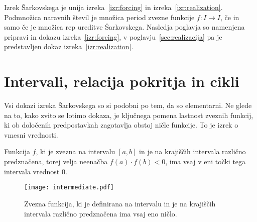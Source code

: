 \documentclass[../TG_magistrsko_delo_sections.tex]{subfiles}
\begin{document}
Izrek Šarkovskega je unija izreka~\ref{izr:forcing} in izreka~\ref{izr:realization}. Podmnožica naravnih števil je množica period zvezne funkcije $f:I \to I$, če in samo če je množica rep ureditve Šarkovskega. Nasledja poglavja so namenjena pripravi in dokazu izreka~\ref{izr:forcing}, v poglavju~\ref{sec:realizacija} pa je predstavljen dokaz izreka~\ref{izr:realization}.

\section{Intervali, relacija pokritja in cikli}%
Vsi dokazi izreka Šarkovskega so si podobni po tem, da so elementarni. Ne glede na to, kako zvito se lotimo dokaza, je ključnega pomena lastnost zveznih funkcij, ki ob določenih predpostavkah zagotavlja obstoj ničle funkcije. To je izrek o vmesni vrednosti.

\begin{izrek}\label{izr:iovv}
Funkcija $f$, ki je zvezna na intervalu $[a, b]$ in je na krajiščih intervala različno predznačena, torej velja neenačba $f(a)\cdot f(b) < 0$, ima vsaj v eni točki tega intervala vrednost 0.
\end{izrek}

\begin{figure}[h]
  \centering
  \texttt{[image: intermediate.pdf]}
  \caption[Primer vektorske slike.]{Zvezna funkcija, ki je definirana na intervalu in je na krajiščih intervala različno predznačena ima vsaj eno ničlo.}
  \label{fig:bezje}
\end{figure}
\end{document}
